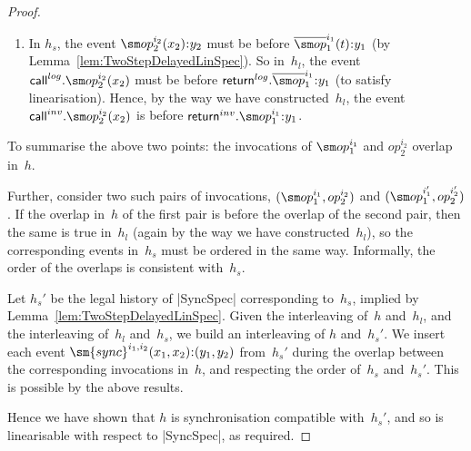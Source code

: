\begin{proof}
\begin{enumerate}
\item In $h_s$, the event $\op_2^{i_2}(x_2)\::y_2$ must be before
  $\overline\op_1^{i_1}(t)\::y_1$ (by Lemma~\ref{lem:TwoStepDelayedLinSpec}).
  So in~$h_l$, the event $\call^{log}.\op_2^{i_2}(x_2)$ must be before
  $\return^{log}.\overline{\op}_1^{i_1} \:: y_1$ (to satisfy linearisation).
  Hence, by the way we have constructed~$h_l$, the event
  $\call^{inv}.\op_2^{i_2}(x_2)$ is before $\return^{inv}.\op_1^{i_1} \::
  y_1$.
\end{enumerate}
%
To summarise the above two points: the invocations of $\op_1^{i_1}$ and
$op_2^{i_2}$ overlap in~$h$. 

Further, consider two such pairs of invocations, $(\op_1^{i_1}, op_2^{i_2})$
and $(\op_1^{i_1'}, op_2^{i_2'})$.  If the overlap in~$h$ of the first pair is
before the overlap of the second pair, then the same is true in~$h_l$ (again
by the way we have constructed~$h_l$), so the corresponding events in~$h_s$
must be ordered in the same way.  Informally, the order of the overlaps is
consistent with~$h_s$. 

Let $h_s'$ be the legal history of |SyncSpec| corresponding to~$h_s$, implied
by Lemma~\ref{lem:TwoStepDelayedLinSpec}.  Given the interleaving of~$h$
and~$h_l$, and the interleaving of~$h_l$ and~$h_s$, we build an interleaving
of $h$ and~$h_s'$.  We insert each event $\sm{sync}^{i_1,i_2}(x_1,x_2)\::
(y_1,y_2)$ from~$h_s'$ during the overlap between the corresponding
invocations in~$h$, and respecting the order of~$h_s$ and~$h_s'$.  This is
possible by the above results.  


Hence we have shown that $h$ is synchronisation compatible with~$h_s'$, and so
is linearisable with respect to |SyncSpec|, as required.
\end{proof}


